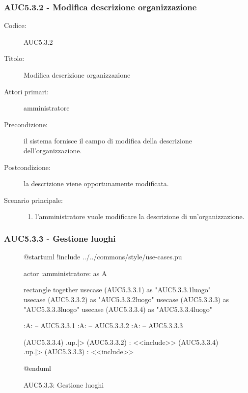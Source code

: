 \documentclass[../../../analisi-dei-requisiti.tex]{subfiles}
\begin{document}
\subsubsection{AUC5.3.2 - Modifica descrizione organizzazione}%
\label{subs:AUC5.3.2}
\begin{description}
  \item[Codice:] AUC5.3.2
  \item[Titolo:] Modifica descrizione organizzazione
  \item[Attori primari:] amministratore
  \item[Precondizione:] il sistema fornisce il campo di modifica della descrizione dell'organizzazione.
  \item[Postcondizione:] la descrizione viene opportunamente modificata.
  \item[Scenario principale:]
  \begin{enumerate}
    \item l'amministratore vuole modificare la descrizione di un'organizzazione.
  \end{enumerate}
\end{description}

\subsubsection{AUC5.3.3 - Gestione luoghi}%
\label{subs:AUC5.3.3}

\begin{figure}[H]
  \centering
  \begin{plantuml}
  @startuml
  !include ../../commons/style/use-cases.pu

  actor :amministratore: as A

  rectangle {
    together {
      usecase (AUC5.3.3.1) as "AUC5.3.3.1\nAggiungi luogo"
      usecase (AUC5.3.3.2) as "AUC5.3.3.2\nEliminazione luogo"
      usecase (AUC5.3.3.3) as "AUC5.3.3.3\nModifica luogo"
    }
    usecase (AUC5.3.3.4) as "AUC5.3.3.4\nSeleziona luogo"
  }

  :A: -- AUC5.3.3.1
  :A: -- AUC5.3.3.2
  :A: -- AUC5.3.3.3

  (AUC5.3.3.4) .up.|> (AUC5.3.3.2) : <<include>>
  (AUC5.3.3.4) .up.|> (AUC5.3.3.3) : <<include>>

  @enduml
  \end{plantuml}
  \caption{AUC5.3.3: Gestione luoghi}
  \label{fig:AUC5_3_3}
\end{figure}
\end{document}
